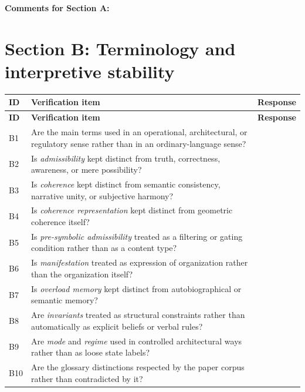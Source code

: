 \documentclass[11pt,a4paper]{article}
\begin{document}
	\textbf{Comments for Section A:}
	
	\vspace{3em}
	
	\section{Section B: Terminology and interpretive stability}
	
	\begin{longtable}{>{\RaggedRight\arraybackslash}p{}
			>{\RaggedRight\arraybackslash}p{}
			>{\RaggedRight\arraybackslash}p{}}
		\toprule
		\textbf{ID} & \textbf{Verification item} & \textbf{Response} \\
		\midrule
		\endfirsthead
		\toprule
		\textbf{ID} & \textbf{Verification item} & \textbf{Response} \\
		\midrule
		\endhead
		
		B1 & Are the main terms used in an operational, architectural, or regulatory sense rather than in an ordinary-language sense? & \\
		
		B2 & Is \emph{admissibility} kept distinct from truth, correctness, awareness, or mere possibility? & \\
		
		B3 & Is \emph{coherence} kept distinct from semantic consistency, narrative unity, or subjective harmony? & \\
		
		B4 & Is \emph{coherence representation} kept distinct from geometric coherence itself? & \\
		
		B5 & Is \emph{pre-symbolic admissibility} treated as a filtering or gating condition rather than as a content type? & \\
		
		B6 & Is \emph{manifestation} treated as expression of organization rather than the organization itself? & \\
		
		B7 & Is \emph{overload memory} kept distinct from autobiographical or semantic memory? & \\
		
		B8 & Are \emph{invariants} treated as structural constraints rather than automatically as explicit beliefs or verbal rules? & \\
		
		B9 & Are \emph{mode} and \emph{regime} used in controlled architectural ways rather than as loose state labels? & \\
		
		B10 & Are the glossary distinctions respected by the paper corpus rather than contradicted by it? & \\
		
		\bottomrule
	\end{longtable}
	
\end{document}
